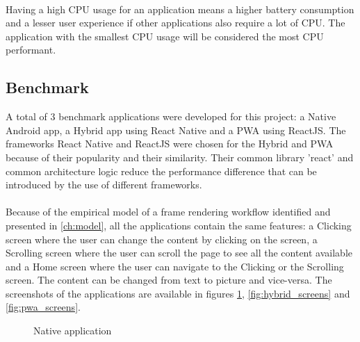 \documentclass{kththesis}
\begin{document}
\paragraph{}
Having a high CPU usage for an application means a higher battery consumption and a lesser user experience if other applications also require a lot of CPU. The application with the smallest CPU usage will be considered the most CPU performant.

\subsection{Benchmark}
\label{method:benchmark}

A total of 3 benchmark applications were developed for this project: a Native Android app, a Hybrid app using React Native and a PWA using ReactJS. The frameworks React Native and ReactJS were chosen for the Hybrid and PWA because of their popularity and their similarity. Their common library 'react' and common architecture logic reduce the performance difference that can be introduced by the use of different frameworks.

\paragraph{}
Because of the empirical model of a frame rendering workflow identified and presented in \autoref{ch:model}, all the applications contain the same features: a Clicking screen where the user can change the content by clicking on the screen, a Scrolling screen where the user can scroll the page to see all the content available and a Home screen where the user can navigate to the Clicking or the Scrolling screen. The content can be changed from text to picture and vice-versa. The screenshots of the applications are available in figures \ref{fig:native_screens}, \ref{fig:hybrid_screens} and \ref{fig:pwa_screens}.

\begin{figure}
    \centering
    \hfill
    \hfill
    \hfill
    \hfill
    \caption{Native application}
    \label{fig:native_screens}
\end{figure}
\end{document}
